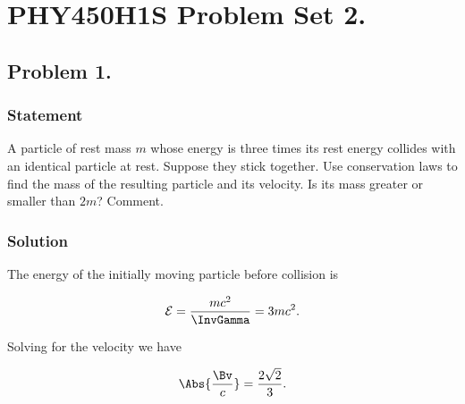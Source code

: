 %


\author{Peeter Joot}

\chapter{PHY450H1S Problem Set 2.}
\label{chap:relElectroDynProblemSet2}
\date{Feb 1, 2011}

\beginArtNoToc
%

\section{Problem 1.}
\subsection{Statement}

A particle of rest mass $m$ whose energy is three times its rest energy collides with an identical particle at rest.  Suppose they stick together.  Use conservation laws to find the mass of the resulting particle and its velocity.  Is its mass greater or smaller than $2m$?  Comment.

\subsection{Solution}

The energy of the initially moving particle before collision is

\begin{equation}\label{eqn:relElectroDynProblemSet2:10}
\mathcal{E} = \frac{m c^2 }{\InvGamma} = 3 m c^2.
\end{equation}

Solving for the velocity we have

\begin{equation}\label{eqn:relElectroDynProblemSet2:30}
\Abs{\frac{\Bv}{c}} = \frac{2 \sqrt{2}}{3}.
\end{equation}

